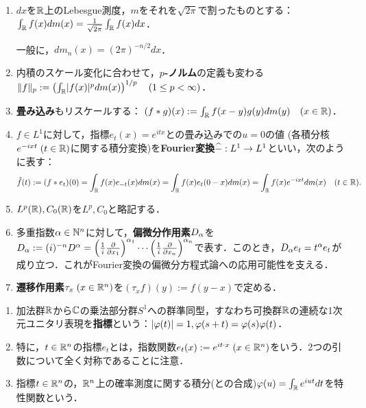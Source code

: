 \documentclass[uplatex,dvipdfmx]{jsreport}
\begin{document}
\begin{notation}\mbox{}
    \begin{enumerate}
        \item $dx$を$\mathbb{R}$上のLebesgue測度，$m$をそれを$\sqrt{2\pi}$で割ったものとする：
        $\int_{\mathbb{R}} f(x)dm(x)=\frac{1}{\sqrt{2\pi}}\int_{\mathbb{R}} f(x)dx$．
        
        一般に，$dm_n(x)=(2\pi)^{-n/2}dx$．
        \item 内積のスケール変化に合わせて，\textbf{$p$-ノルム}の定義も変わる
        $\|f\|_p:=\left(\int_{\mathbb{R}}\lvert f(x)\rvert^pdm(x)\right)^{1/p}\quad(1\le p<\infty)$．
        \item \textbf{畳み込み}もリスケールする：
        $(f*g)(x):=\int_{\mathbb{R}} f(x-y)g(y)dm(y)\quad(x\in\mathbb{R})$．
        \item $f\in L^1$に対して，指標$e_t(x)=e^{itx}$との畳み込みでの$u=0$の値
        (各積分核$e^{-ixt}\;(t\in\mathbb{R})$に関する積分変換)を\textbf{Fourier変換}$\widehat{-}:L^1\to L^1$といい，次のように表す：
        \[\hat{f}(t):=(f*e_t)(0)=\int_{\mathbb{R}} f(x)e_{-t}(x)dm(x)=\int_{\mathbb{R}} f(x)e_t(0-x)dm(x)=\int_{\mathbb{R}} f(x)e^{-ixt}dm(x)\quad(t\in\mathbb{R}).\]
        \item $L^p(\mathbb{R}),C_0(\mathbb{R})$を$L^p,C_0$と略記する．
        \item 多重指数$\alpha\in\mathbb{N}^n$に対して，\textbf{偏微分作用素}$D_\alpha$を$D_\alpha:=(i)^{-n}D^\alpha=\left(\frac{1}{i}\frac{\partial }{\partial x_1}\right)^{\alpha_1}\cdots\left(\frac{1}{i}\frac{\partial }{\partial x_n}\right)^{\alpha_n}$で表す．このとき，$D_\alpha e_t=t^\alpha e_t$が成り立つ．これがFourier変換の偏微分方程式論への応用可能性を支える．
        \item \textbf{遷移作用素}$\tau_x\;(x\in\mathbb{R}^n)$を$(\tau_xf)(y):=f(y-x)$で定める．
    \end{enumerate}
\end{notation}

\begin{definition}\mbox{}
    \begin{enumerate}
        \item 加法群$\mathbb{R}$から$\mathbb{C}$の乗法部分群$S^1$への群準同型，すなわち可換群$\mathbb{R}$の連続な1次元ユニタリ表現を\textbf{指標}という：$\lvert\varphi(t)\rvert=1,\varphi(s+t)=\varphi(s)\varphi(t)$．
        \item 特に，$t\in\mathbb{R}^n$の指標$e_t$とは，指数関数$e_t(x):=e^{it\cdot x}\;(x\in\mathbb{R}^n)$をいう．2つの引数について全く対称であることに注意．
        \item 指標$t\in\mathbb{R}^n$の，$\mathbb{R}^n$上の確率測度に関する積分(との合成)$\varphi(u)=\int_{\mathbb{R}} e^{iut}dt$を特性関数という．
    \end{enumerate}
\end{definition}
\end{document}
